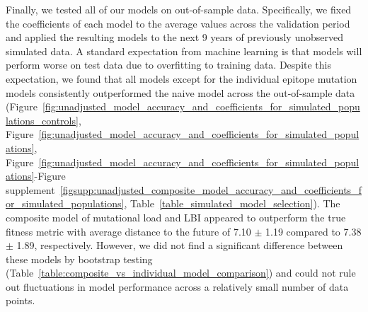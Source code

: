 Finally, we tested all of our models on out-of-sample data.
Specifically, we fixed the coefficients of each model to the average values across the validation period and applied the resulting models to the next 9 years of previously unobserved simulated data.
A standard expectation from machine learning is that models will perform worse on test data due to overfitting to training data.
Despite this expectation, we found that all models except for the individual epitope mutation models consistently outperformed the naive model across the out-of-sample data (Figure~\ref{fig:unadjusted_model_accuracy_and_coefficients_for_simulated_populations_controls}, Figure~\ref{fig:unadjusted_model_accuracy_and_coefficients_for_simulated_populations}, Figure~\ref{fig:unadjusted_model_accuracy_and_coefficients_for_simulated_populations}-Figure supplement~\ref{figsupp:unadjusted_composite_model_accuracy_and_coefficients_for_simulated_populations}, Table~\ref{table_simulated_model_selection}).
The composite model of mutational load and LBI appeared to outperform the true fitness metric with average distance to the future of 7.10 $\pm$ 1.19 compared to 7.38 $\pm$ 1.89, respectively.
However, we did not find a significant difference between these models by bootstrap testing (Table~\ref{table:composite_vs_individual_model_comparison}) and could not rule out fluctuations in model performance across a relatively small number of data points.

